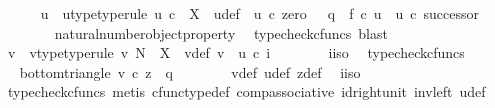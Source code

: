 \begin{isabellebody}
\isanewline
\ \ \ \ \isamarkupfalse%
\ u\ \ u{\isacharunderscore}{\kern0pt}type{\isacharbrackleft}{\kern0pt}type{\isacharunderscore}{\kern0pt}rule{\isacharbrackright}{\kern0pt}{\isacharcolon}{\kern0pt}\ {\isachardoublequoteopen}u{\isacharcolon}{\kern0pt}\ {\isasymnat}\isactrlsub c\ {\isasymrightarrow}\ X{\isachardoublequoteclose}\ \ u{\isacharunderscore}{\kern0pt}def{\isacharcolon}{\kern0pt}\ \ {\isachardoublequoteopen}u\ {\isasymcirc}\isactrlsub c\ zero\ {\isacharequal}{\kern0pt}\ \ q\ {\isasymand}\ f\ {\isasymcirc}\isactrlsub c\ u\ {\isacharequal}{\kern0pt}\ u\ {\isasymcirc}\isactrlsub c\ successor{\isachardoublequoteclose}\isanewline
\ \ \ \ \ \ \isamarkupfalse%
\ natural{\isacharunderscore}{\kern0pt}number{\isacharunderscore}{\kern0pt}object{\isacharunderscore}{\kern0pt}property{}\ \isamarkupfalse%
\ {\isacharparenleft}{\kern0pt}typecheck{\isacharunderscore}{\kern0pt}cfuncs{\isacharcomma}{\kern0pt}\ blast{\isacharparenright}{\kern0pt}\isanewline
\ \ \ \ \isamarkupfalse%
\ v\ \ v{\isacharunderscore}{\kern0pt}type{\isacharbrackleft}{\kern0pt}type{\isacharunderscore}{\kern0pt}rule{\isacharbrackright}{\kern0pt}{\isacharcolon}{\kern0pt}\ {\isachardoublequoteopen}v{\isacharcolon}{\kern0pt}\ N\ {\isasymrightarrow}\ X{\isachardoublequoteclose}\ \ v{\isacharunderscore}{\kern0pt}def{\isacharcolon}{\kern0pt}\ {\isachardoublequoteopen}v\ {\isacharequal}{\kern0pt}\ u\ {\isasymcirc}\isactrlsub c\ i\isactrlbold {\isasyminverse}{\isachardoublequoteclose}\isanewline
\ \ \ \ \ \ \isamarkupfalse%
\ i{\isacharunderscore}{\kern0pt}iso\ \isamarkupfalse%
\ typecheck{\isacharunderscore}{\kern0pt}cfuncs\isanewline
\ \ \ \ \isamarkupfalse%
\ \isamarkupfalse%
\ bottom{\isacharunderscore}{\kern0pt}triangle{\isacharcolon}{\kern0pt}\ {\isachardoublequoteopen}v\ {\isasymcirc}\isactrlsub c\ z\ {\isacharequal}{\kern0pt}\ q{\isachardoublequoteclose}\isanewline
\ \ \ \ \ \ \isamarkupfalse%
\ v{\isacharunderscore}{\kern0pt}def\ u{\isacharunderscore}{\kern0pt}def\ z{\isacharunderscore}{\kern0pt}def\ \isamarkupfalse%
\ i{\isacharunderscore}{\kern0pt}iso\isanewline
\ \ \ \ \ \ \isamarkupfalse%
\ {\isacharparenleft}{\kern0pt}typecheck{\isacharunderscore}{\kern0pt}cfuncs{\isacharcomma}{\kern0pt}\ metis\ cfunc{\isacharunderscore}{\kern0pt}type{\isacharunderscore}{\kern0pt}def\ comp{\isacharunderscore}{\kern0pt}associative\ id{\isacharunderscore}{\kern0pt}right{\isacharunderscore}{\kern0pt}unit{}\ inv{\isacharunderscore}{\kern0pt}left\ u{\isacharunderscore}{\kern0pt}def{\isacharparenright}{\kern0pt}\isanewline

\end{isabellebody}
